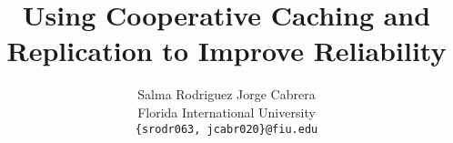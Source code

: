 \documentclass[letterpaper,twocolumn,10pt]{article}
\title{\Large \bf Using Cooperative Caching and Replication to Improve Reliability}
\author{
  {\rm Salma Rodriguez}
  \qquad
  {\rm Jorge Cabrera}
  \\
  Florida International University
  \\
  {\rm \texttt{\{srodr063, jcabr020\}@fiu.edu}}
  \\
}
\date{}
\begin{document}
\maketitle






{
  \footnotesize
  
  
}
\end{document}
